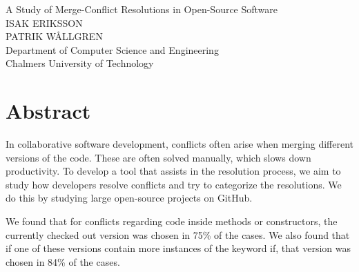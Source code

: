 A Study of Merge-Conflict Resolutions in Open-Source Software\\

ISAK ERIKSSON\\
PATRIK WÅLLGREN\\
Department of Computer Science and Engineering\\
Chalmers University of Technology \setlength{\parskip}{0.5cm}

\thispagestyle{plain}			%
\section*{Abstract}
In collaborative software development, conflicts often arise when merging different versions of the code. These are often solved manually, which slows down productivity. To develop a tool that assists in the resolution process, we aim to study how developers resolve conflicts and try to categorize the resolutions. We do this by studying large open-source projects on GitHub.

We found that for conflicts regarding code inside methods or constructors, the currently checked out version was chosen in 75\% of the cases. We also found that if one of these versions contain more instances of the keyword if, that version was chosen in 84\% of the cases.


\newpage				%
\thispagestyle{empty}
\mbox{}


